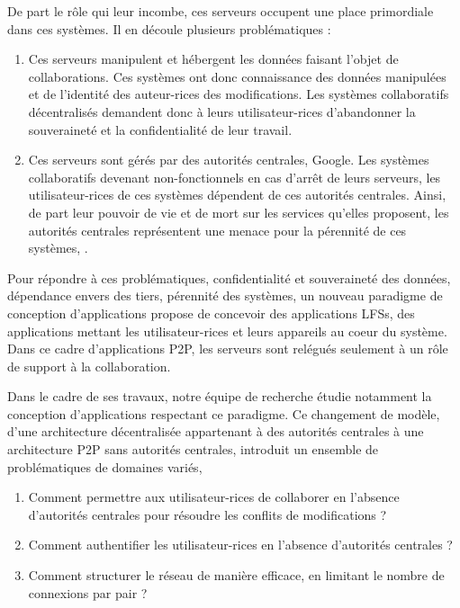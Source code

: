 De part le rôle qui leur incombe, ces serveurs occupent une place primordiale dans ces systèmes.
Il en découle plusieurs problématiques :
\begin{enumerate}
    \item Ces serveurs manipulent et hébergent les données faisant l'objet de collaborations.
        Ces systèmes ont donc connaissance des données manipulées et de l'identité des auteur-rices des modifications.
        Les systèmes collaboratifs décentralisés demandent donc à leurs utilisateur-rices d'abandonner la souveraineté et la confidentialité de leur travail.
    \item Ces serveurs sont gérés par des autorités centrales, \eg Google.
        Les systèmes collaboratifs devenant non-fonctionnels en cas d'arrêt de leurs serveurs, les utilisateur-rices de ces systèmes dépendent de ces autorités centrales.
        Ainsi, de part leur pouvoir de vie et de mort sur les services qu'elles proposent, les autorités centrales représentent une menace pour la pérennité de ces systèmes, \eg \cite{2022-killed-by-google}.
\end{enumerate}

Pour répondre à ces problématiques, \ie confidentialité et souveraineté des données, dépendance envers des tiers, pérennité des systèmes, un nouveau paradigme de conception d'applications propose de concevoir des applications \acp{LFS}, \ie des applications mettant les utilisateur-rices et leurs appareils au coeur du système.
Dans ce cadre d'applications \ac{P2P}, les serveurs sont relégués seulement à un rôle de support à la collaboration.

Dans le cadre de ses travaux, notre équipe de recherche étudie notamment la conception d'applications respectant ce paradigme.
Ce changement de modèle, d'une architecture décentralisée appartenant à des autorités centrales à une architecture \ac{P2P} sans autorités centrales, introduit un ensemble de problématiques de domaines variés, \eg
\begin{enumerate}
    \item Comment permettre aux utilisateur-rices de collaborer en l'absence d'autorités centrales pour résoudre les conflits de modifications ?
    \item Comment authentifier les utilisateur-rices en l'absence d'autorités centrales ?
    \item Comment structurer le réseau de manière efficace, \ie en limitant le nombre de connexions par pair ?
\end{enumerate}


